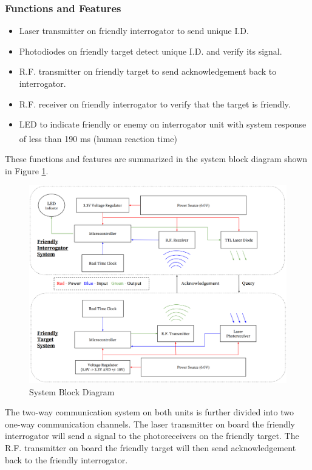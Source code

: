 \documentclass[letterpaper,10pt]{article}
\begin{document}
\begin{spacing}{1.15}
\subsubsection{Functions and Features}
\begin{itemize}
	\item Laser transmitter on friendly interrogator to send unique I.D.
	\item Photodiodes on friendly target detect unique I.D. and verify its signal.
	\item R.F. transmitter on friendly target to send acknowledgement back to interrogator.
	\item R.F. receiver on friendly interrogator to verify that the target is friendly.
	\item LED to indicate friendly or enemy on interrogator unit with system response of less than 190 ms (human reaction time\textsuperscript{\cite{Reaction_Times}})
\end{itemize}

These functions and features are summarized in the system block diagram shown in Figure \ref{fig:system-block-diagram}. 

\begin{figure} [H]
	\centering
	\includegraphics[scale=0.45]{System_Block_Diagram.png}
	\caption{System Block Diagram\label{fig:system-block-diagram}}
\end{figure}

The two-way communication system on both units is further divided into two one-way communication channels. The laser transmitter on board the friendly interrogator will send a signal to the photoreceivers on the friendly target. The R.F. transmitter on board the friendly target will then send acknowledgement back to the friendly interrogator. 


\end{spacing}
\end{document}

